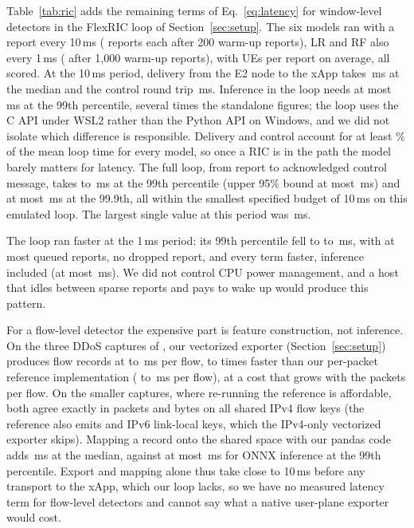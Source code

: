 Table~\ref{tab:ric} adds the remaining terms of Eq.~\eqref{eq:latency} for window-level detectors in the FlexRIC loop of Section~\ref{sec:setup}. The six models ran with a report every 10\,ms (\RicNten{} reports each after 200 warm-up reports), LR and RF also every 1\,ms (\RicNone{} after 1,000 warm-up reports), with \RicUEs{} UEs per report on average, all scored. At the 10\,ms period, delivery from the E2 node to the xApp takes \RicIndTenPfifty{}\,ms at the median and the control round trip \RicActTenPfifty{}\,ms. Inference in the loop needs at most \RicInfTenPnnMax{}\,ms at the 99th percentile, several times the standalone figures; the loop uses the C API under WSL2 rather than the Python API on Windows, and we did not isolate which difference is responsible. Delivery and control account for at least \RicTransportShareMin\% of the mean loop time for every model, so once a RIC is in the path the model barely matters for latency. The full loop, from report to acknowledged control message, takes \RicLoopTenPnnMin{} to \RicLoopTenPnnMax{}\,ms at the 99th percentile (upper 95\% bound at most \RicLoopTenPnnHiMax{}\,ms) and at most \RicLoopTenPnnnMax{}\,ms at the 99.9th, all within the smallest specified budget of 10\,ms on this emulated loop. The largest single value at this period was \RicLoopTenMax{}\,ms.

The loop ran faster at the 1\,ms period: its 99th percentile fell to \RicLoopOnePnnMin{} to \RicLoopOnePnnMax{}\,ms, with at most \RicQueueMax{} queued reports, no dropped report, and every term faster, inference included (at most \RicInfOnePnnMax{}\,ms). We did not control CPU power management, and a host that idles between sparse reports and pays to wake up would produce this pattern.

For a flow-level detector the expensive part is feature construction, not inference. On the three DDoS captures of \DA{}, our vectorized exporter (Section~\ref{sec:setup}) produces flow records at \LatExtrMin{} to \LatExtrMax{}\,ms per flow, \LatExtrSpeedMin{} to \LatExtrSpeedMax{} times faster than our per-packet reference implementation (\LatExtrRefMin{} to \LatExtrRefMax{}\,ms per flow), at a cost that grows with the packets per flow. On the \LatEqCaptures{} smaller captures, where re-running the reference is affordable, both agree exactly in packets and bytes on all \LatEqKeys{} shared IPv4 flow keys (the reference also emits \LatRefOnlyMin{} and \LatRefOnlyMax{} IPv6 link-local keys, which the IPv4-only vectorized exporter skips). Mapping a record onto the shared space with our pandas code adds \LatMapPfifty{}\,ms at the median, against at most \LatNetOnnxPnnMax{}\,ms for ONNX inference at the 99th percentile. Export and mapping alone thus take close to 10\,ms before any transport to the xApp, which our loop lacks, so we have no measured latency term for flow-level detectors and cannot say what a native user-plane exporter would cost.

